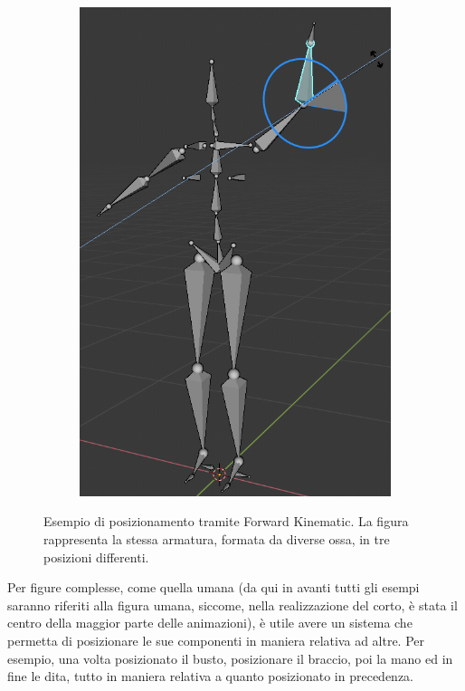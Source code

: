 \begin{figure}
\begin{subfigure}{.33\textwidth}
  \includegraphics[width=\linewidth]{Figures/armature3}
  \label{fig:FK3}
\end{subfigure}
\decoRule
\caption[Forward Kinematic]{Esempio di posizionamento tramite Forward Kinematic. La figura rappresenta la stessa armatura, formata da diverse ossa, in tre posizioni differenti.}
\label{fig:FK}
\end{figure}

Per figure complesse, come quella umana (da qui in avanti tutti gli esempi saranno riferiti alla figura umana, siccome, nella realizzazione del corto, è stata il centro della maggior parte delle animazioni), è utile avere un sistema che permetta di posizionare le sue componenti in maniera relativa ad altre. Per esempio, una volta posizionato il busto, posizionare il braccio, poi la mano ed in fine le dita, tutto in maniera relativa a quanto posizionato in precedenza.

